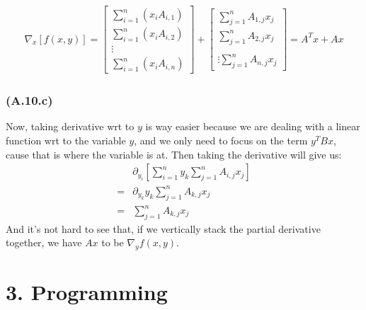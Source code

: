 \documentclass[]{article}
\begin{document}
            \begin{align*}\tag{2.10.b.2}\label{eqn:2.10.b.2}
                \nabla_x[f(x, y)] = 
                \begin{bmatrix}
                    \sum_{i = 1}^{n}\left(x_i A_{i, 1}\right)
                    \\
                    \sum_{i = 1}^{n}\left(x_i A_{i, 2}\right)
                    \\
                    \vdots
                    \\
                    \sum_{i = 1}^{n}\left(x_i A_{i, n}\right)
                \end{bmatrix}
                +
                \begin{bmatrix}
                    \sum_{j = 1}^{n}A_{1, j}x_j\\
                    \sum_{j = 1}^{n}A_{2, j}x_j\\
                    \\
                    \vdots
                    \sum_{j = 1}^{n}A_{n, j}x_j
                \end{bmatrix}
                =
                A^Tx + Ax
            \end{align*}
        \subsubsection*{(A.10.c)}
            Now, taking derivative wrt to $y$ is way easier because we are dealing with a linear function wrt to the variable $y$, and we only need to focus on the term $y^TBx$, cause that is where the variable is at. Then taking the derivative will give us: 
            \begin{align*}\tag{2.10.c.1}\label{eqn:2.10.c.1}
                & \partial_{y_i} \left[
                    \sum_{i = 1}^{n}y_k
                        \sum_{j = 1}^{n}A_{i,j} x_j
                \right]
                \\
                =& 
                \partial_{y_k}
                y_k \sum_{j = 1}^{n}A_{k, j}x_j
                \\
                =&
                \sum_{j = 1}^{n}A_{k, j}x_j
            \end{align*}
            And it's not hard to see that, if we vertically stack the partial derivative together, we have $Ax$ to be $\nabla_y f(x, y)$.
    
            
\section*{3. Programming}
\end{document}

